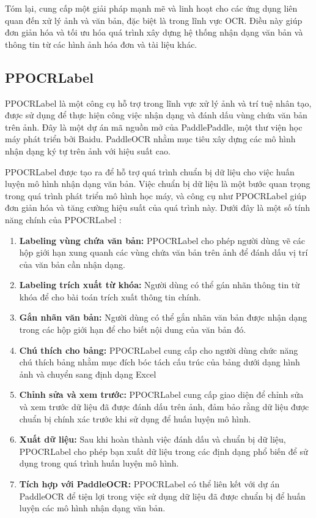 Tóm lại, cung cấp một giải pháp mạnh mẽ và linh hoạt cho các ứng dụng liên quan đến xử lý ảnh và văn bản, đặc biệt là trong lĩnh vực OCR. Điều này giúp đơn giản hóa và tối ưu hóa quá trình xây dựng hệ thống nhận dạng văn bản và thông tin từ các hình ảnh hóa đơn và tài liệu khác.

\subsection{PPOCRLabel}
PPOCRLabel là một công cụ hỗ trợ trong lĩnh vực xử lý ảnh và trí tuệ nhân tạo, được sử dụng để thực hiện công việc nhận dạng và đánh dấu vùng chứa văn bản trên ảnh. Đây là một dự án mã nguồn mở của PaddlePaddle, một thư viện học máy phát triển bởi Baidu. PaddleOCR nhằm mục tiêu xây dựng các mô hình nhận dạng ký tự trên ảnh với hiệu suất cao.

PPOCRLabel được tạo ra để hỗ trợ quá trình chuẩn bị dữ liệu cho việc huấn luyện mô hình nhận dạng văn bản. Việc chuẩn bị dữ liệu là một bước quan trọng trong quá trình phát triển mô hình học máy, và công cụ như PPOCRLabel giúp đơn giản hóa và tăng cường hiệu suất của quá trình này. Dưới đây là một số tính năng chính của PPOCRLabel \cite{ppocrlabel}:
\begin{enumerate}
    \item \textbf{Labeling vùng chứa văn bản:} PPOCRLabel cho phép người dùng vẽ các hộp giới hạn xung quanh các vùng chứa văn bản trên ảnh để đánh dấu vị trí của văn bản cần nhận dạng.
    \item \textbf{Labeling trích xuất từ khóa:} Người dùng có thể gán nhãn thông tin từ khóa để cho bài toán trích xuất thông tin chính.
    \item \textbf{Gắn nhãn văn bản:} Người dùng có thể gắn nhãn văn bản được nhận dạng trong các hộp giới hạn để cho biết nội dung của văn bản đó.
    \item \textbf{Chú thích cho bảng:} PPOCRLabel cung cấp cho người dùng chức năng chú thích bảng nhằm mục đích bóc tách cấu trúc của bảng dưới dạng hình ảnh và chuyển sang định dạng Excel
    \item \textbf{Chỉnh sửa và xem trước:} PPOCRLabel cung cấp giao diện để chỉnh sửa và xem trước dữ liệu đã được đánh dấu trên ảnh, đảm bảo rằng dữ liệu được chuẩn bị chính xác trước khi sử dụng để huấn luyện mô hình.
    \item \textbf{Xuất dữ liệu:} Sau khi hoàn thành việc đánh dấu và chuẩn bị dữ liệu, PPOCRLabel cho phép bạn xuất dữ liệu trong các định dạng phổ biến để sử dụng trong quá trình huấn luyện mô hình.
    \item \textbf{Tích hợp với PaddleOCR:} PPOCRLabel có thể liên kết với dự án PaddleOCR để tiện lợi trong việc sử dụng dữ liệu đã được chuẩn bị để huấn luyện các mô hình nhận dạng văn bản.
\end{enumerate}

